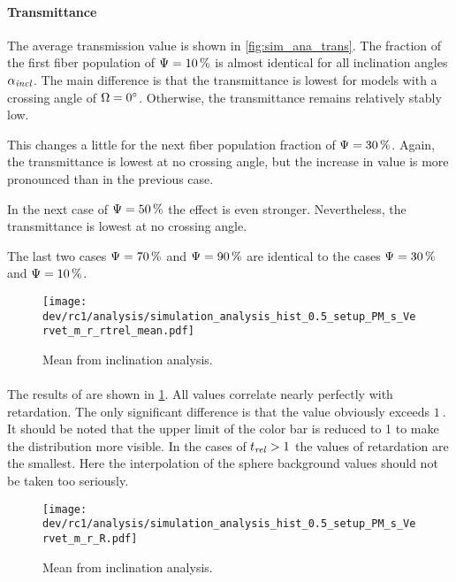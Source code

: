 \paragraph{Transmittance}
The average transmission value is shown in \cref{fig:sim_ana_trans}.
The fraction of the first fiber population of $\textnormal{$\Psi$}=\SI{10}{\percent}$ is almost identical for all inclination angles $\textnormal{$\alpha_{\mathit{incl}}$}$.
The main difference is that the transmittance is lowest for models with a crossing angle of $\textnormal{$\Omega$} = \SI{0}{\degree}$.
Otherwise, the transmittance remains relatively stably low.
\par
%
This changes a little for the next fiber population fraction of $\textnormal{$\Psi$}=\SI{30}{\percent}$.
Again, the transmittance is lowest at no crossing angle, but the increase in value is more pronounced than in the previous case.
\par
%
In the next case of $\textnormal{$\Psi$}=\SI{50}{\percent}$ the effect is even stronger.
Nevertheless, the transmittance is lowest at no crossing angle.
\par
%
The last two cases $\textnormal{$\Psi$}=\SI{70}{\percent}$ and $\textnormal{$\Psi$}=\SI{90}{\percent}$ are identical to the cases $\textnormal{$\Psi$}=\SI{30}{\percent}$ and $\textnormal{$\Psi$}=\SI{10}{\percent}$.
%
%
%
\begin{figure}[!p]
\centering
\texttt{[image: dev/rc1/analysis/simulation\_analysis\_hist\_0.5\_setup\_PM\_s\_Vervet\_m\_r\_rtrel\_mean.pdf]}
\caption{Mean \trel{} from inclination analysis. }
\label{fig:sim_ana_trel}
\end{figure}
%
\paragraph{\trel}
The results of \trel{} are shown in \cref{fig:sim_ana_trel}.
All values correlate nearly perfectly with retardation.
The only significant difference is that the \trel{} value obviously exceeds $\SI{1}{}$.
It should be noted that the upper limit of the color bar is reduced to 1 to make the distribution more visible.
In the cases of $\textnormal{$t_\mathit{rel}$} > \SI{1}{}$ the values of retardation are the smallest.
Here the interpolation of the sphere background values should not be taken too seriously.
%
%
%
\begin{figure}[!p]
\centering
\texttt{[image: dev/rc1/analysis/simulation\_analysis\_hist\_0.5\_setup\_PM\_s\_Vervet\_m\_r\_R.pdf]}
\caption{Mean \rvalue{} from inclination analysis. }
\label{fig:sim_ana_rvalue}
\end{figure}
%

